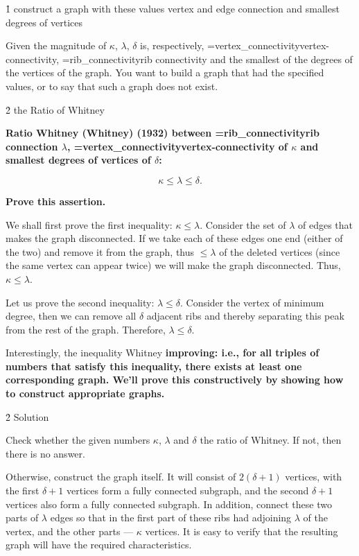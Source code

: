 \h1{ construct a graph with these values vertex and edge connection and smallest degrees of vertices }

Given the magnitude of $\kappa$, $\lambda$, $\delta$ is, respectively, \algohref=vertex_connectivity{vertex-connectivity}, \algohref=rib_connectivity{rib connectivity} and the smallest of the degrees of the vertices of the graph. You want to build a graph that had the specified values, or to say that such a graph does not exist.


\h2{ the Ratio of Whitney }

\bf{Ratio Whitney (Whitney)} (1932) between \algohref=rib_connectivity{rib connection} $\lambda$, \algohref=vertex_connectivity{vertex-connectivity} of $\kappa$ and smallest degrees of vertices of $\delta$:

$$ \kappa \le \lambda \le \delta. $$

\bf{Prove} this assertion.

We shall first prove the first inequality: $\kappa \le \lambda$. Consider the set of $\lambda$ of edges that makes the graph disconnected. If we take each of these edges one end (either of the two) and remove it from the graph, thus $\le \lambda$ of the deleted vertices (since the same vertex can appear twice) we will make the graph disconnected. Thus, $\kappa \le \lambda$.

Let us prove the second inequality: $\lambda \le \delta$. Consider the vertex of minimum degree, then we can remove all $\delta$ adjacent ribs and thereby separating this peak from the rest of the graph. Therefore, $\lambda \le \delta$.

Interestingly, the inequality Whitney \bf{improving}: i.e., for all triples of numbers that satisfy this inequality, there exists at least one corresponding graph. We'll prove this constructively by showing how to construct appropriate graphs.


\h2{ Solution }

Check whether the given numbers $\kappa$, $\lambda$ and $\delta$ the ratio of Whitney. If not, then there is no answer.

Otherwise, construct the graph itself. It will consist of $2 (\delta + 1)$ vertices, with the first $\delta + 1$ vertices form a fully connected subgraph, and the second $\delta + 1$ vertices also form a fully connected subgraph. In addition, connect these two parts of $\lambda$ edges so that in the first part of these ribs had adjoining $\lambda$ of the vertex, and the other parts --- $\kappa$ vertices. It is easy to verify that the resulting graph will have the required characteristics.